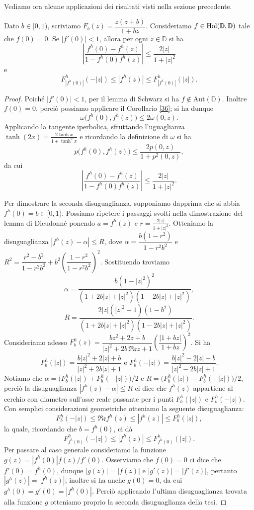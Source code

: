 Vediamo ora alcune applicazioni dei risultati visti nella sezione precedente.

\begin{thm} \label{distortion}
  Dato $b \in [0,1)$, scriviamo $F_b(z)=\dfrac{z(z+b)}{1+b z}$. Consideriamo $f \in \normalfont{\text{Hol}}(\mathbb{D},\mathbb{D})$ tale che $f(0)=0$. Se $|f'(0)|<1$, allora per ogni $z \in \mathbb{D}$ si ha
  \begin{equation}
    \left|\frac{f^h(0)-f^h(z)}{1-f^h(0)f^h(z)}\right| \le \frac{2|z|}{1+|z|^2}
  \end{equation}
  e
  \begin{equation}
    F_{|f^h(0)|}^h(-|z|) \le |f^h(z)| \le F_{|f^h(0)|}^h(|z|).
  \end{equation}
\end{thm}

\begin{proof}
  Poiché $|f'(0)|<1$, per il lemma di Schwarz si ha $f \not\in \text{Aut}(\mathbb{D})$. Inoltre $f(0)=0$, perciò possiamo applicare il Corollario \ref{36}; si ha dunque
  $$\omega\bigl(f^h(0),f^h(z)\bigr) \le 2\omega(0,z).$$
  Applicando la tangente iperbolica, sfruttando l'uguaglianza $\tanh(2x)=\frac{2\tanh{x}}{1+\tanh^2{x}}$ e ricordando la definizione di $\omega$ si ha
  $$p\bigl(f^h(0),f^h(z)\bigr) \le \frac{2p(0,z)}{1+p^2(0,z)},$$
  da cui
  $$\left|\frac{f^h(0)-f^h(z)}{1-f^h(0)f^h(z)}\right| \le \frac{2|z|}{1+|z|^2}.$$

  Per dimostrare la seconda disuguaglianza, supponiamo dapprima che si abbia $f^h(0)=b \in [0,1)$. Possiamo ripetere i passaggi svolti nella dimostrazione del lemma di Dieudonné ponendo $a=f^h(z)$ e $r=\frac{2|z|}{1+|z|^2}$. Otteniamo la disuguaglianza $|f^h(z)-\alpha| \le R$, dove $\alpha=\dfrac{b(1-r^2)}{1-r^2b^2}$ e $R^2=\dfrac{r^2-b^2}{1-r^2b^2}+b^2\left(\dfrac{1-r^2}{1-r^2b^2}\right)^2$. Sostituendo troviamo
  $$\alpha=\frac{b(1-|z|^2)^2}{(1+2b|z|+|z|^2)(1-2b|z|+|z|^2)},$$
  $$R=\frac{2|z|(|z|^2+1)(1-b^2)}{(1+2b|z|+|z|^2)(1-2b|z|+|z|^2)}.$$
  Consideriamo adesso $F_b^h(z)=\dfrac{bz^2+2z+b}{|z|^2+2b\,\mathfrak{Re}z+1}\left(\dfrac{|1+b z|}{1+b z}\right)^2$. Si ha
  $$F_b^h(|z|)=\dfrac{b|z|^2+2|z|+b}{|z|^2+2b|z|+1} \text{ e } F_b^h(-|z|)=\dfrac{b|z|^2-2|z|+b}{|z|^2-2b|z|+1}.$$
  Notiamo che $\alpha=\bigl(F_b^h(|z|)+F_b^h(-|z|)\bigr)/2$ e $R=\bigl(F_b^h(|z|)-F_b^h(-|z|)\bigr)/2$, perciò la disuguaglianza $|f^h(z)-\alpha| \le R$ ci dice che $f^h(z)$ appartiene al cerchio con diametro sull'asse reale passante per i punti $F_b^h(|z|)$ e $F_b^h(-|z|)$. Con semplici considerazioni geometriche otteniamo la seguente disuguaglianza:
  $$F_b^h(-|z|) \le \mathfrak{Re}f^h(z) \le |f^h(z)| \le F_b^h(|z|),$$
  la quale, ricordando che $b=f^h(0)$, ci dà
  $$F_{f^h(0)}^h(-|z|) \le |f^h(z)| \le F_{f^h(0)}^h(|z|).$$
  Per passare al caso generale consideriamo la funzione $g(z)=|f^h(0)|f(z)/f'(0)$. Osserviamo che $f(0)=0$ ci dice che $f'(0)=f^h(0)$, dunque $|g(z)|=|f(z)|$ e $|g'(z)|=|f'(z)|$, pertanto $|g^h(z)|=|f^h(z)|$; inoltre si ha anche $g(0)=0$, da cui $g^h(0)=g'(0)=|f^h(0)|$. Perciò applicando l'ultima disuguaglianza trovata alla funzione $g$ otteniamo proprio la seconda disuguaglianza della tesi.
\end{proof}

